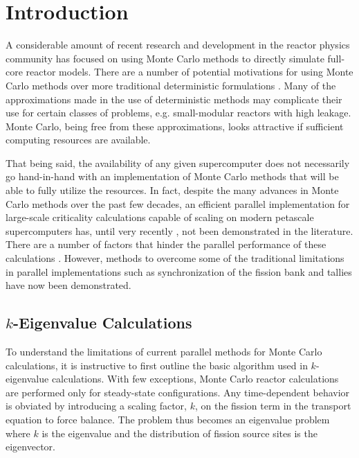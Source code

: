 \documentclass[3p,fleqn]{elsarticle}
\begin{document}
\section{Introduction}

A considerable amount of recent research and development in the reactor physics
community has focused on using Monte Carlo methods to directly simulate
full-core reactor models. There are a number of potential motivations for using
Monte Carlo methods over more traditional deterministic formulations
\cite{jnet-martin-2012, jcp-siegel-2012-2}. Many of the approximations made in
the use of deterministic methods may complicate their use for certain classes of
problems, e.g. small-modular reactors with high leakage. Monte Carlo, being free
from these approximations, looks attractive if sufficient computing resources
are available.

That being said, the availability of any given supercomputer does not
necessarily go hand-in-hand with an implementation of Monte Carlo methods that
will be able to fully utilize the resources. In fact, despite the many advances
in Monte Carlo methods over the past few decades, an efficient parallel
implementation for large-scale criticality calculations capable of scaling on
modern petascale supercomputers has, until very recently \cite{ane-romano-2013},
not been demonstrated in the literature. There are a number of factors that
hinder the parallel performance of these calculations \cite{jnet-martin-2012,
  pnst-brown-2011}. However, methods to overcome some of the traditional
limitations in parallel implementations such as synchronization of the fission
bank \cite{nse-romano-2012, ane-romano-2013} and tallies
\cite{trans-romano-2012} have now been demonstrated.

\subsection{$k$-Eigenvalue Calculations}

To understand the limitations of current parallel methods for Monte Carlo
calculations, it is instructive to first outline the basic algorithm used in
$k$-eigenvalue calculations. With few exceptions, Monte Carlo reactor
calculations are performed only for steady-state configurations. Any
time-dependent behavior is obviated by introducing a scaling factor, $k$, on the
fission term in the transport equation to force balance. The problem thus
becomes an eigenvalue problem where $k$ is the eigenvalue and the distribution
of fission source sites is the eigenvector.
\end{document}
